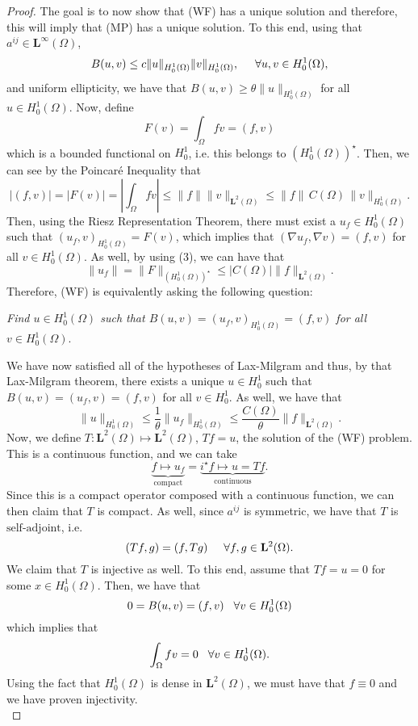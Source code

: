 \documentclass[oneside]{book}
\newcommand{\Om}{\Omega}
\newcommand{\dint}{\displaystyle\int}
\newcommand{\dintom}{\dint_{\Om}}
\newcommand{\ml}{\mathbf{L}}
\newcommand{\aij}{a^{ij}}
\newcommand{\Hz}{H_0^1}
\newcommand{\Hzo}{H_0^1(\Om)}
\newcommand{\Hzod}{\left( H_0^1(\Om)\right)^{\star}}
\newcommand{\mlto}{\ml^2(\Om)}
\newcommand{\saj}{\text{self-adjoint}}
\newcommand{\is}{i^{\star}}
\begin{document}
\begin{proof}
The goal is to now show that (WF) has a unique solution and therefore, this will imply that (MP) has a unique solution. To this end, using that $\aij \in \ml^{\infty}(\Om)$,  
\[ B(u, v) \leq c \| u \|_{\Hzo} \| v \|_{\Hzo}, \hspace{5mm} \forall u, v \in \Hzo,\]
and uniform ellipticity, we have that $B(u, v) \geq \theta \| u \|_{\Hzo}$ for all $u \in \Hzo$. Now, define 
\[F(v) = \dintom fv = (f,v) \]
which is a bounded functional on $\Hz$, i.e. this belongs to $\Hzod$. Then, we can see by the Poincar\'e Inequality that 
\begin{equation}
|(f, v)| = |F(v)| = \left| \dintom fv \right| \leq \| f \| \| v \|_{\mlto} \leq \| f \| \,  C(\Om) \, \| v \|_{\Hzo}.
\end{equation}
Then, using the Riesz Representation Theorem, there must exist a $u_f \in \Hzo$ such that $(u_f, v)_{\Hzo} = F(v)$, which implies that $(\nabla u_f, \nabla v) = (f, v)$ for all $v \in \Hzo$. As well, by using (3), we can have that 
\[ \| u_f \| = \| F \|_{\Hzod} \leq |C(\Om)| \| f \|_{\mlto}.\]
Therefore, (WF) is equivalently asking the following question:
\begin{center}
\textit{Find $u \in \Hzo$ such that $B(u, v) = (u_f, v)_{\Hzo} = (f, v)$ for all $v \in \Hzo$}.
\end{center}
We have now satisfied all of the hypotheses of Lax-Milgram and thus, by that Lax-Milgram theorem, there exists a unique $u \in \Hz$ such that $B(u, v) = (u_f, v) = (f, v)$ for all $v \in \Hz$. As well, we have that 
\[ \| u \|_{\Hzo} \leq \frac{1}{\theta} \| u_f \|_{\Hzo} \leq \frac{C(\Om)}{\theta} \| f \|_{\mlto}.\]
Now, we define $T: \mlto \mapsto \mlto$, $Tf = u$, the solution of the (WF) problem. This is a continuous function, and we can take 
\[ \underbrace{f \mapsto u_f}_{\text{compact}} = \underbrace{\is f \mapsto u = Tf}_{\text{continuous} }.\]
Since this is a compact operator composed with a continuous function, we can then claim that $T$ is compact. As well, since $\aij$ is symmetric, we have that $T$ is $\saj$, i.e.
\[ (Tf, g) = (f, Tg) \hspace{5mm} \forall f, g \in \mlto.\]
We claim that $T$ is injective as well. To this end, assume that $Tf = u = 0$ for some $x \in \Hzo$. Then, we have that 
\[ 0 = B(u, v) = (f, v) \hspace{3mm} \forall v \in \Hzo \]
which implies that 
\[ \dintom fv = 0 \hspace{3mm} \forall v \in \Hzo. \]
Using the fact that $\Hzo$ is dense in $\mlto$, we must have that $f \equiv 0$ and we have proven injectivity. \\

\end{proof}
\end{document}
